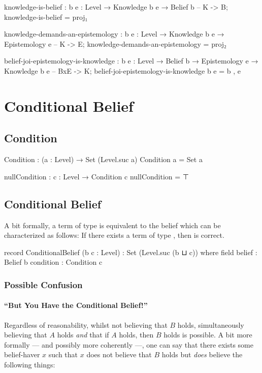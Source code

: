 \documentclass{article}
\begin{document}
\begin{code}
knowledge-is-belief : {b e : Level} → Knowledge b e → Belief b -- K -> B;
knowledge-is-belief = proj₁
\end{code}

\begin{code}
knowledge-demands-an-epistemology :
  {b e : Level} → Knowledge b e → Epistemology e -- K -> E;
knowledge-demands-an-epistemology = proj₂
\end{code}

\begin{code}
belief-joi-epistemology-is-knowledge :
  {b e : Level} → Belief b → Epistemology e → Knowledge b e -- BxE -> K;
belief-joi-epistemology-is-knowledge b e = b , e
\end{code}

\section{Conditional Belief}

\subsection{Condition}

\begin{code}
Condition : (a : Level) → Set (Level.suc a)
Condition a = Set a

nullCondition : {c : Level} → Condition c
nullCondition = ⊤
\end{code}

\subsection{Conditional Belief}
A bit formally, a term  of type  is equivalent to the belief which can be characterized as follows: If there exists a term of type  , then   is correct.

\begin{code}
record ConditionalBelief (b c : Level) : Set (Level.suc (b ⊔ c)) where
  field
    belief : Belief b
    condition : Condition c
\end{code}

\subsubsection{Possible Confusion}
\paragraph{``But You Have the Conditional Belief!''}
Regardless of reasonability, whilst not believing that \(B\) holds, simultaneously believing that \(A\) holds \emph{and} that if \(A\) holds, then \(B\) holds is possible.  A bit more formally --- and possibly more coherently ---, one can say that there exists some belief-haver \(x\) such that \(x\) does not believe that \(B\) holds but \emph{does} believe the following things:
\end{document}
